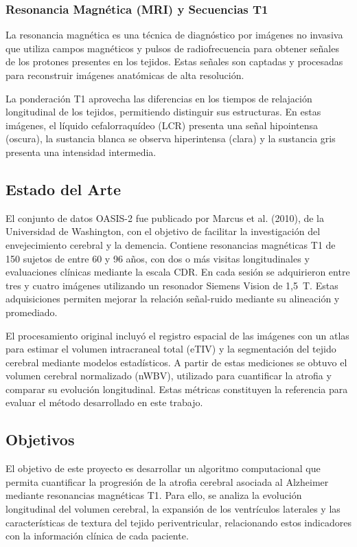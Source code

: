 \documentclass[10pt]{article}
\begin{document}
\subsubsection{Resonancia Magnética (MRI) y Secuencias T1}

La resonancia magnética es una técnica de diagnóstico por imágenes no invasiva que utiliza campos magnéticos y pulsos de radiofrecuencia para obtener señales de los protones presentes en los tejidos. Estas señales son captadas y procesadas para reconstruir imágenes anatómicas de alta resolución.

La ponderación T1 aprovecha las diferencias en los tiempos de relajación longitudinal de los tejidos, permitiendo distinguir sus estructuras. En estas imágenes, el líquido cefalorraquídeo (LCR) presenta una señal hipointensa (oscura), la sustancia blanca se observa hiperintensa (clara) y la sustancia gris presenta una intensidad intermedia.

\subsection{Estado del Arte}

El conjunto de datos OASIS-2 fue publicado por Marcus et al. (2010), de la Universidad de Washington, con el objetivo de facilitar la investigación del envejecimiento cerebral y la demencia. Contiene resonancias magnéticas T1 de 150 sujetos de entre 60 y 96 años, con dos o más visitas longitudinales y evaluaciones clínicas mediante la escala CDR. En cada sesión se adquirieron entre tres y cuatro imágenes utilizando un resonador Siemens Vision de 1,5~T. Estas adquisiciones permiten mejorar la relación señal-ruido mediante su alineación y promediado.

El procesamiento original incluyó el registro espacial de las imágenes con un atlas para estimar el volumen intracraneal total (eTIV) y la segmentación del tejido cerebral mediante modelos estadísticos. A partir de estas mediciones se obtuvo el volumen cerebral normalizado (nWBV), utilizado para cuantificar la atrofia y comparar su evolución longitudinal. Estas métricas constituyen la referencia para evaluar el método desarrollado en este trabajo.

\subsection{Objetivos}

El objetivo de este proyecto es desarrollar un algoritmo computacional que permita cuantificar la progresión de la atrofia cerebral asociada al Alzheimer mediante resonancias magnéticas T1. Para ello, se analiza la evolución longitudinal del volumen cerebral, la expansión de los ventrículos laterales y las características de textura del tejido periventricular, relacionando estos indicadores con la información clínica de cada paciente.
\end{document}
